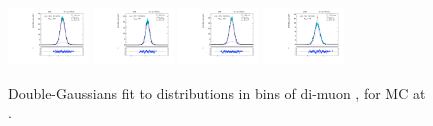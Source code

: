 \begin{figure}[htb]
\includegraphics[width=0.19\textwidth]{plots/Appendix_Recoil_Fits/ZmmMC_PF_5TeV_2G/pfu1fit_32.pdf}
\includegraphics[width=0.19\textwidth]{plots/Appendix_Recoil_Fits/ZmmMC_PF_5TeV_2G/pfu1fit_33.pdf}
\includegraphics[width=0.19\textwidth]{plots/Appendix_Recoil_Fits/ZmmMC_PF_5TeV_2G/pfu1fit_34.pdf}
\includegraphics[width=0.19\textwidth]{plots/Appendix_Recoil_Fits/ZmmMC_PF_5TeV_2G/pfu1fit_35.pdf}
\caption{Double-Gaussians fit to \upar distributions in bins of di-muon \pt, for \zmm MC at \serag.}
\label{fig:a:recoil:fit:mc:u1:5}
\end{figure}